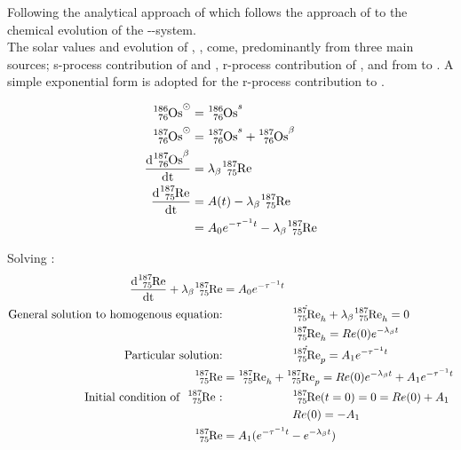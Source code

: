 
\renewcommand{\d}[1]{\frac{\textrm{d}#1}{\textrm{dt}}}
\newcommand{\pd}[2]{\frac{\partial #1}{\partial #2}}

Following the analytical approach of  which follows the approach of  to the chemical evolution of the --system. \\
The solar values and evolution of , ,  come, predominantly from three main sources;
s-process contribution of  and , r-process contribution of ,
and \betadecay from  to .
A simple exponential form is adopted for the r-process contribution to .

\begin{align*}
  \os{186}^\odot &= \os{186}^s \\
  \os{187}^\odot &= \os{187}^s + \os{187}^\beta \\
  \d{\os{187}^\beta} &= \lambda_\beta\re{187} \\
  \d{\re{187}} &= A(t) - \lambda_\beta\re{187} \\
  &= A_0e^{-\tau^{-1}t} - \lambda_\beta\re{187} \\
\end{align*}

Solving :
\begin{align*}
  \d{\re{187}} + \lambda_\beta \re{187} &= A_0e^{-\tau^{-1}t} \\
  \textrm{General solution to homogenous equation:}
  & \hspace{6em} \dot{\re{187}}_h + \lambda_\beta \re{187}_h = 0 \\
  & \hspace{6em} \re{187}_h = Re(0) e^{-\lambda_\beta t} \\
  \textrm{Particular solution:}
  & \hspace{6em} \dot{\re{187}}_p = A_1 e^{-\tau^{-1}t} \\
  \re{187} &= \re{187}_h + \re{187}_p = Re(0) e^{-\lambda_\beta t} + A_1 e^{-\tau^{-1}t} \\
  \textrm{Initial condition of \re{187}:}
  & \hspace{6em} \re{187}(t=0) = 0 = Re(0) + A_1 \\
  & \hspace{6em} Re(0) = - A_1 \\
  \re{187} &= A_1 (e^{-\tau^{-1}t} - e^{-\lambda_\beta t}) \\
\end{align*}


